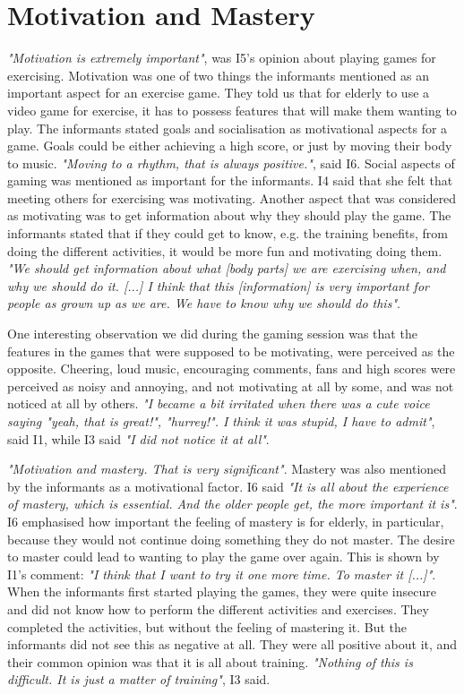 \section{Motivation and Mastery}

\emph{"Motivation is extremely important"}, was I5's opinion about playing games for exercising. Motivation was one of two things the informants mentioned as an important aspect for an exercise game. They told us that for elderly to use a video game for exercise, it has to possess features that will make them wanting to play. The informants stated goals and socialisation as motivational aspects for a game. Goals could be either achieving a high score, or just by moving their body to music.  \emph{"Moving to a rhythm, that is always positive."}, said I6. Social aspects of gaming was mentioned as important for the informants. I4 said that she felt that meeting others for exercising was motivating.   Another aspect that was considered as motivating was to get information about why they should play the game. The informants stated that if they could get to know, e.g. the training benefits, from doing the different activities, it would be more fun and motivating doing them. \emph{"We should get information about what [body parts] we are exercising when, and why we should do it. [...] I think that this [information] is very important for people as grown up as we are. We have to know why we should do this"}. 

One interesting observation we did during the gaming session was that the features in the games that were supposed to be motivating, were perceived as the opposite. Cheering, loud music, encouraging comments, fans and high scores were perceived as noisy and annoying, and not motivating at all by some, and was not noticed at all by others. \emph{"I became a bit irritated when there was a cute voice saying "yeah, that is great!", "hurrey!". I think it was stupid, I have to admit"}, said I1, while I3 said \emph{"I did not notice it at all"}. 

\emph{"Motivation and mastery. That is very significant"}. Mastery was also mentioned by the informants as a motivational factor. I6 said \emph{"It is all about the experience of mastery, which is essential. And the older people get, the more important it is"}. I6 emphasised how important the feeling of mastery is for elderly, in particular, because they would not continue doing something they do not master. The desire to master could lead to wanting to play the game over again. This is shown by I1's comment: \emph{"I think that I want to try it one more time. To master it [...]"}. When the informants first started playing the games, they were quite insecure and did not know how to perform the different activities and exercises. They completed the activities, but without the feeling of mastering it. But the informants did not see this as negative at all. They were all positive about it, and their common opinion was that it is all about training. \emph{"Nothing of this is difficult. It is just a matter of training"}, I3 said. 

